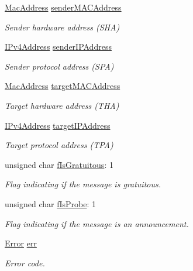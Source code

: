 \begin{DoxyCompactItemize}
\mbox{\hyperlink{ethernet_types_8h_a7fed77396097fa92ca5f4b185844244c}{Mac\+Address}} \mbox{\hyperlink{struct_a_r_pmessage___a373dc2ffcc6b2a5b9a8682478906c256}{sender\+M\+A\+C\+Address}}
\begin{DoxyCompactList}\small\item\em Sender hardware address (S\+HA) \end{DoxyCompactList}\item 
\mbox{\hyperlink{group__ipv4_gac3530474aec32033cd4709abdc7bded7}{I\+Pv4\+Address}} \mbox{\hyperlink{struct_a_r_pmessage___a327239df3565c3a31da48f74b65e15b1}{sender\+I\+P\+Address}}
\begin{DoxyCompactList}\small\item\em Sender protocol address (S\+PA) \end{DoxyCompactList}\item 
\mbox{\hyperlink{ethernet_types_8h_a7fed77396097fa92ca5f4b185844244c}{Mac\+Address}} \mbox{\hyperlink{struct_a_r_pmessage___a2502d1b812373dc5a0de1647165b40ea}{target\+M\+A\+C\+Address}}
\begin{DoxyCompactList}\small\item\em Target hardware address (T\+HA) \end{DoxyCompactList}\item 
\mbox{\hyperlink{group__ipv4_gac3530474aec32033cd4709abdc7bded7}{I\+Pv4\+Address}} \mbox{\hyperlink{struct_a_r_pmessage___a810f2c0c6e91e68940dbf87740664f0f}{target\+I\+P\+Address}}
\begin{DoxyCompactList}\small\item\em Target protocol address (T\+PA) \end{DoxyCompactList}\item 
unsigned char \mbox{\hyperlink{struct_a_r_pmessage___abf4812a73fd577ace2b9fc876deb3a41}{f\+Is\+Gratuitous}}\+: 1
\begin{DoxyCompactList}\small\item\em Flag indicating if the message is gratuitous. \end{DoxyCompactList}\item 
unsigned char \mbox{\hyperlink{struct_a_r_pmessage___acfb90603349e0df772a79dae542dfa7c}{f\+Is\+Probe}}\+: 1
\begin{DoxyCompactList}\small\item\em Flag indicating if the message is an announcement. \end{DoxyCompactList}\item 
\mbox{\hyperlink{group__error_gada9d6bcf34dabaf048e197cb7b69fa6a}{Error}} \mbox{\hyperlink{struct_a_r_pmessage___a9078d3b85b5a7c46fc5c80899bd3b6b3}{err}}
\begin{DoxyCompactList}\small\item\em Error code. \end{DoxyCompactList}\end{DoxyCompactItemize}


